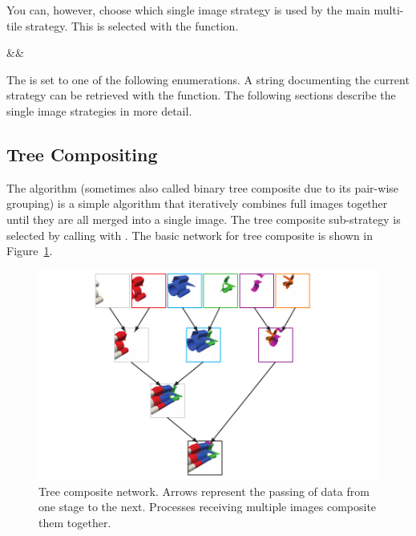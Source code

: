 You can, however, choose which single image strategy is used by the main
multi-tile strategy.  This is selected with the
 function.

\begin{Table}{3}
  \textC{(}&&\quad\textC{);}
\end{Table}

The  is set to one of the following enumerations.  A string
documenting the current strategy can be retrieved with the
 function.  The following sections
describe the single image strategies in more detail.



\subsection{Tree Compositing}


The  algorithm (sometimes also called binary tree
composite due to its pair-wise grouping) is a simple algorithm that
iteratively combines full images together until they are all merged into a
single image.  The tree composite sub-strategy is selected by calling
 with
.  The basic network for tree
composite is shown in Figure~\ref{fig:BinaryTree}.

\begin{figure}
  \centering
  \includegraphics{images/BinaryTree}
  \caption[Tree composite network.]{Tree composite network.  Arrows
    represent the passing of data from one stage to the next.  Processes
    receiving multiple images composite them together.}
  \label{fig:BinaryTree}
\end{figure}

